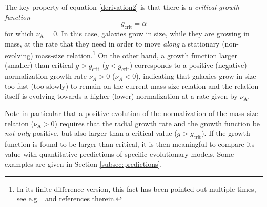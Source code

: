 \documentclass[fleqn,usenatbib]{mnras}
\begin{document}
The key property of equation \eqref{derivation2} is that there is a \emph{critical growth function}
\begin{equation}\label{equation}
g_\textrm{crit} = \alpha
\end{equation}
for which $\nu_\textrm{A} = 0$. In this case, galaxies grow in size, while they are growing in mass, at the rate that they need in order to move \emph{along} a stationary (non-evolving) mass-size relation.\footnote{In its finite-difference version, this fact has been pointed out multiple times, see e.g.\ \cite{Wilman+20} and references therein.} On the other hand, a growth function larger (smaller) than critical $g > g_\textrm{crit}$ ($g < g_\textrm{crit}$) corresponds to a positive (negative) normalization growth rate $\nu_A > 0$ ($\nu_A < 0$), indicating that galaxies grow in size too fast (too slowly) to remain on the current mass-size relation and the relation itself is evolving towards a higher (lower) normalization at a rate given by $\nu_\textrm{A}$.

Note in particular that a positive evolution of the normalization of the mass-size relation ($\nu_\textrm{A} > 0$) requires that the radial growth rate and the growth function be \emph{not only} positive, but also larger than a critical value ($g > g_\textrm{crit}$). If the growth function is found to be larger than critical, it is then meaningful to compare its value with quantitative predictions of specific evolutionary models. Some examples are given in Section \ref{subsec:predictions}.

\end{document}

